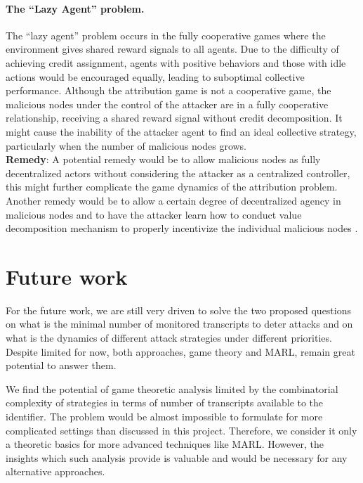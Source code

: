 \documentclass[a4paper,11pt]{article}
\begin{document}
\paragraph{The ``Lazy Agent'' problem.} The ``lazy agent'' problem occurs in the fully cooperative games where the environment gives shared reward signals to all agents. Due to the difficulty of achieving credit assignment, agents with positive behaviors and those with idle actions would be encouraged equally, leading to suboptimal collective performance. Although the attribution game is not a cooperative game, the malicious nodes under the control of the attacker are in a fully cooperative relationship, receiving a shared reward signal without credit decomposition. It might cause the inability of the attacker agent to find an ideal collective strategy, particularly when the number of malicious nodes grows. \\ {\bf{Remedy}}: A potential remedy would be to allow malicious nodes as fully decentralized actors without considering the attacker as a centralized controller, this might further complicate the game dynamics of the attribution problem. Another remedy would be to allow a certain degree of decentralized agency in malicious nodes and to have the attacker learn how to conduct value decomposition mechanism to properly incentivize the individual malicious nodes \cite{DBLP:journals/corr/SunehagLGCZJLSL17}. 




\section{Future work}\label{sec:future}
For the future work, we are still very driven to solve the two proposed questions on what is the minimal number of monitored transcripts to deter attacks and on what is the dynamics of different attack strategies under different priorities. Despite limited for now, both approaches, game theory and MARL, remain great potential to answer them. 

We find the potential of game theoretic analysis limited by the combinatorial complexity of strategies in terms of number of transcripts available to the identifier. The problem would be almost impossible to formulate for more complicated settings than discussed in this project. Therefore, we consider it only a theoretic basics for more advanced techniques like MARL. However, the insights which such analysis provide is valuable and would be necessary for any alternative approaches.
\end{document}
